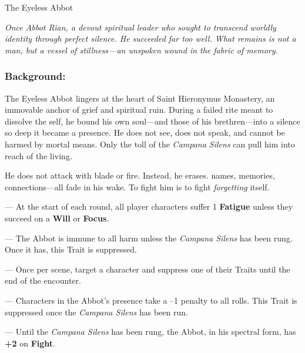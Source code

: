 \documentclass[nodeprecatedcode,bg=print]{dndbook/dndbook}
\begin{document}
\begin{WyrdFullNPC}[%
    name=The Eyeless Abbot,%
    description=Silence Incarnate,%
    float=!t%
  ]{The Eyeless Abbot}
  
  \emph{Once Abbot Rian, a devout spiritual leader who sought to transcend worldly identity through perfect silence. He succeeded far too well. What remains is not a man, but a vessel of stillness—an unspoken wound in the fabric of memory.}
  
  \subsubsection*{Background:}
  The Eyeless Abbot lingers at the heart of Saint Hieronymus Monastery, an immovable anchor of grief and spiritual ruin. During a failed rite meant to dissolve the self, he bound his own soul—and those of his brethren—into a silence so deep it became a presence. He does not see, does not speak, and cannot be harmed by mortal means. Only the toll of the \emph{Campana Silens} can pull him into reach of the living.
  
  He does not attack with blade or fire. Instead, he erases. names, memories, connections—all fade in his wake. To fight him is to fight \emph{forgetting} itself.
  
  \vspace{0.5\baselineskip}
  \SkillsBox[%
    expert={Will},%
    skilled={Focus, Insight},%
    novice={Fight, Awareness}%
  ]
  
  \begin{TraitsBox}
    \item[Silence Hungers] — At the start of each round, all player characters suffer 1 \textbf{Fatigue} unless they succeed on a \Challenging \textbf{Will} or \textbf{Focus}.
    \item[Untouchable Form] — The Abbot is immune to all harm unless the \emph{Campana Silens} has been rung. Once it has, this Trait is suppressed.
    \item[Erase the Self] — Once per scene, target a character and suppress one of their Traits until the end of the encounter.
    \item[Aura of Dread] — Characters in the Abbot’s presence take a –1 penalty to all rolls. This Trait is suppressed once the \emph{Campana Silens} has been run.
    \item[Formless Wrath] — Until the \emph{Campana Silens} has been rung, the Abbot, in his spectral form, has \textbf{+2} on \textbf{Fight}.
  \end{TraitsBox}

  \DamageBox
\end{WyrdFullNPC}
\end{document}
